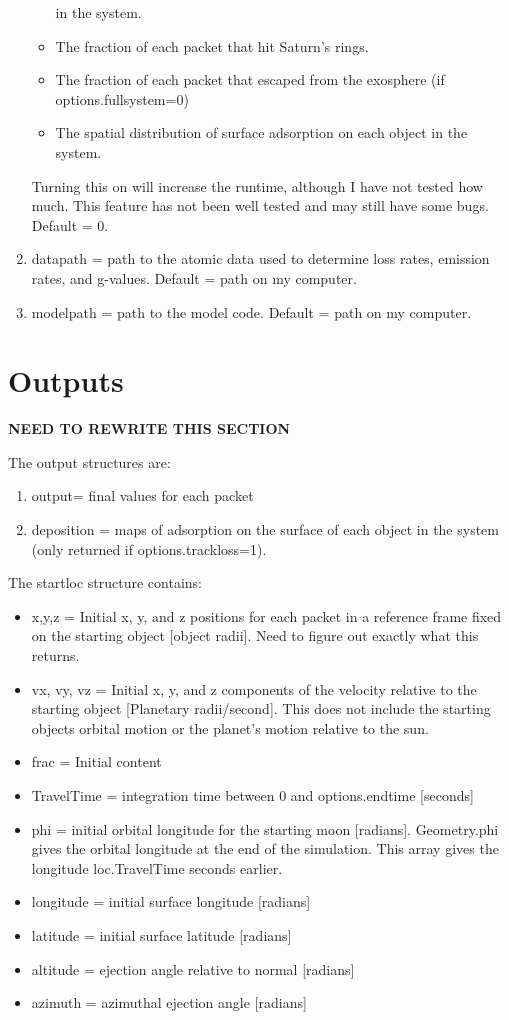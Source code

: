 \documentclass[11pt]{article}
\begin{document}
\begin{enumerate}
\begin{itemize}
  in the system.
  \item The fraction of each packet that hit Saturn's rings.
  \item The fraction of each packet that escaped from the exosphere (if
  options.fullsystem=0)
  \item The spatial distribution of surface adsorption on each object in the
  system.
  \end{itemize}
Turning this on will increase the runtime, although I have not tested how much.
This feature has not been well tested and may still have some bugs. Default =
0.
\item {\color{red}datapath} = path to the atomic data used to determine loss
rates, emission rates, and g-values. Default = path on my computer.
\item {\color{red}modelpath} = path to the model code. Default = path on my
computer.
\end{enumerate}

\section{Outputs}

\textbf{NEED TO REWRITE THIS SECTION}

The output structures are:
\begin{enumerate}
\item output= final values for each packet
\item deposition = maps of adsorption on the surface of each object in the
system (only returned if options.trackloss=1).
\end{enumerate}

The startloc structure contains:
\begin{itemize}
\item x,y,z = Initial x, y, and z positions for each packet in a reference frame
fixed on the starting object [object radii]. Need to figure out exactly what
this returns.
\item vx, vy, vz = Initial x, y, and z components of the velocity relative to
the starting object [Planetary radii/second]. This does not include the
starting objects orbital motion or the planet's motion relative to the sun.
\item frac = Initial content 
\item TravelTime = integration time between 0 and
options.endtime [seconds]
\item phi = initial orbital longitude for the starting moon [radians].
Geometry.phi gives the orbital longitude at the end of the simulation. This
array gives the longitude loc.TravelTime seconds earlier.
\item longitude = initial surface longitude [radians]
\item latitude = initial surface latitude [radians]
\item altitude = ejection angle relative to normal [radians]
\item azimuth = azimuthal ejection angle [radians]
\end{itemize}
\end{document}
